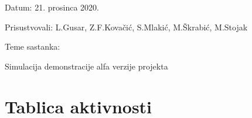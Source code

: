 \begin{packed_enum}
			\item[] \begin{packed_item}
				\item Datum:  21. prosinca 2020.
				\item Prisustvovali: L.Gusar, Z.F.Kovačić, S.Mlakić, M.Škrabić, M.Stojak
				\item Teme sastanka:
				\begin{packed_item}
					\item  Simulacija demonstracije alfa verzije projekta\\
				\end{packed_item}
			\end{packed_item}
			
		\end{packed_enum}
			
		
		\eject
		\section*{Tablica aktivnosti}
					
						
			
